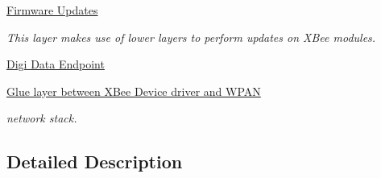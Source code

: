 \begin{DoxyCompactItemize}
\hyperlink{group__xbee__firmware}{Firmware Updates}
\begin{DoxyCompactList}\small\item\em This layer makes use of lower layers to perform updates on X\+Bee modules. \end{DoxyCompactList}\item 
\hyperlink{group__xbee__digi__data}{Digi Data Endpoint}
\item 
\hyperlink{group__xbee__wpan}{Glue layer between X\+Bee Device driver and W\+P\+AN}
\begin{DoxyCompactList}\small\item\em network stack. \end{DoxyCompactList}\end{DoxyCompactItemize}


\subsection{Detailed Description}
